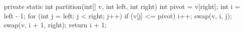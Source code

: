 \begin{unipdcode}[language=Java]
private static int partition(int[] v, int left, int right) {
    int pivot = v[right];
    int i = left - 1;
    for (int j = left; j < right; j++) {
        if (v[j] <= pivot) {
            i++;
            swap(v, i, j);
        }
    }
    swap(v, i + 1, right);
    return i + 1;
}
\end{unipdcode}
